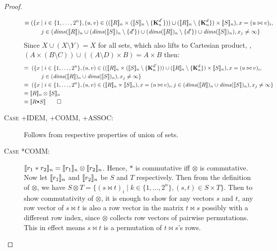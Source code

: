 \begin{proof}
\begin{description}
\begin{align*}
\equiv & \; (\{x \mid i \in \{1, \ldots, 2^n\},
                   (u, v) \in ((\interp{R}_n \times (\interp{S}_n \setminus
         \{\zeroEntry{d'}{n}\})) \cup (\interp{R}_n \setminus
         \{\zeroEntry{d}{n}\}) \times \interp{S}_n),
                   x = (u \bowtie v)_i, \\
 & \qquad         j \in (\effdims{\interp{R}}{n} \cup
         (\effdims{\interp{S}}{n} \setminus \{d'\}) \cup (\effdims{\interp{R}}{n} \setminus
         \{d'\}) \cup \effdims{\interp{S}}{n}),
                   x_j \neq \infty
                  \}
\end{align*}
%
Since $X \cup (X \setminus Y) = X$ for all sets, which also lifts to
Cartesian product, \ie{}, $(A \times (B \setminus C)) \cup ((A \setminus
D) \times B) = A \times B$ then:
%
\begin{align*}
\equiv \; & \; (\{x \mid i \in \{1, \ldots, 2^n\},
                   (u, v) \in ((\interp{R}_n \times (\interp{S}_n \setminus
         \{\zeroEntry{d'}{n}\})) \cup (\interp{R}_n \setminus
         \{\zeroEntry{d}{n}\}) \times \interp{S}_n),
                   x = (u \bowtie v)_i, \\
 & \qquad         j \in (\effdims{\interp{R}}{n} \cup \effdims{\interp{S}}{n}),
                   x_j \neq \infty
                  \} \\
\equiv \; & \; (\{x \mid i \in \{1, \ldots, 2^n\},
                   (u, v) \in (\interp{R}_n \times \interp{S}_n),
                   x = (u \bowtie v)_i, j \in (\effdims{\interp{R}}{n} \cup \effdims{\interp{S}}{n}),
                   x_j \neq \infty
                  \} \\
\equiv \; & \interp{R}_n \otimes \interp{S}_n \\
\equiv \; & \interp{R \term{*} S} \qed 
\end{align*}

  \item[\textsc{Case +IDEM, +COMM, +ASSOC}:]
    Follows from respective properties of union of sets.
  \item[\textsc{Case *COMM}:] $\interp{r_1 \; \texttt{$\ast$} \; r_2}_n =
    \interp{r_1}_n \otimes \interp{r_2}_n$. Hence, $\texttt{$\ast$}$ is
    commutative iff $\otimes$ is commutative. Now let $\interp{r_1}_n$ and
    $\interp{r_2}_n$ be $S$ and $T$ respectively. Then from the definition of
    $\otimes$, we have $S \otimes T = \{ (s \bowtie t)_i \mid k \in
    \{ 1, \ldots, 2^n \}, (s,t) \in S \times T \}$. Then to show
    commutativity of $\otimes$, it is enough to show for any vectors $s$ and
    $t$, any row vector of $s \bowtie t$ is also a row vector in the matrix
    $t \bowtie s$ possibly with a different row index, since $\otimes$ collects
    row vectors of pairwise permutations. This in effect means $s \bowtie t$
    is a permutation of $t \bowtie s$'s rows.


\end{description}
\end{proof}

